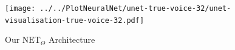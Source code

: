 \documentclass[12pt]{article}
\begin{document}


    
    
    
    
    




\begin{figure}[ht]
  \texttt{[image: ../../PlotNeuralNet/unet-true-voice-32/unet-visualisation-true-voice-32.pdf]}
\caption{Our $\text{NET}_{\Theta}$ Architecture}
\label{fig:my_unet}
\end{figure}
\end{document}
